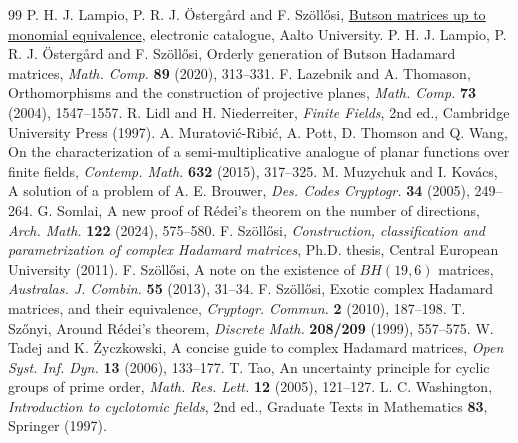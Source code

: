 \documentclass[11pt,a4paper]{article}
\numberwithin{equation}{section}
\begin{document}
\begin{thebibliography}{99}
 P. H. J. Lampio, P. R. J. \"Osterg\aa rd and F. Sz\"oll\H{o}si, \href{https://wiki.aalto.fi/spaces/Butson/pages/120482304}{Butson matrices up to monomial equivalence}, electronic catalogue, Aalto University.
 P. H. J. Lampio, P. R. J. \"Osterg\aa rd and F. Sz\"oll\H{o}si, Orderly generation of Butson Hadamard matrices, \emph{Math. Comp.} \textbf{89} (2020), 313--331.
 F. Lazebnik and A. Thomason, Orthomorphisms and the construction of projective planes, \emph{Math. Comp.} \textbf{73} (2004), 1547--1557.
 R. Lidl and H. Niederreiter, \emph{Finite Fields}, 2nd ed., Cambridge University Press (1997).
 A. Muratovi\'c-Ribi\'c, A. Pott, D. Thomson and Q. Wang, On the characterization of a semi-multiplicative analogue of planar functions over finite fields, \emph{Contemp. Math.} \textbf{632} (2015), 317--325.
 M. Muzychuk and I. Kov\'acs, A solution of a problem of A. E. Brouwer, \emph{Des. Codes Cryptogr.} \textbf{34} (2005), 249--264.
 G. Somlai, A new proof of R\'edei's theorem on the number of directions, \emph{Arch. Math.} \textbf{122} (2024), 575--580.
 F. Sz\"oll\H{o}si, \emph{Construction, classification and parametrization of complex Hadamard matrices}, Ph.D. thesis, Central European University (2011).
 F. Sz\"oll\H{o}si, A note on the existence of $BH(19,6)$ matrices, \emph{Australas. J. Combin.} \textbf{55} (2013), 31--34.
 F. Sz\"oll\H{o}si, Exotic complex Hadamard matrices, and their equivalence, \emph{Cryptogr. Commun.} \textbf{2} (2010), 187--198.
 T. Sz\H{o}nyi, Around R\'edei's theorem, \emph{Discrete Math.} \textbf{208/209} (1999), 557--575.
 W. Tadej and K. \.Zyczkowski, A concise guide to complex Hadamard matrices, \emph{Open Syst. Inf. Dyn.} \textbf{13} (2006), 133--177.
 T. Tao, An uncertainty principle for cyclic groups of prime order, \emph{Math. Res. Lett.} \textbf{12} (2005), 121--127.
 L. C. Washington, \emph{Introduction to cyclotomic fields}, 2nd ed., Graduate Texts in Mathematics \textbf{83}, Springer (1997).
\end{thebibliography}
\endgroup
\end{document}
